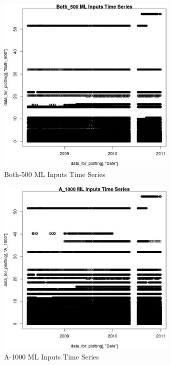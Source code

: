 \begin{figure} 
\centering  
\includegraphics[width=0.77\textwidth]{Code_Outputs/ML_input_report_ML_input_PM25_Step5_part_d_de_duplicated_aves_ML_input_Both_500vDate.jpg} 
\caption{\label{fig:ML_input_report_ML_input_PM25_Step5_part_d_de_duplicated_aves_ML_inputBoth_500vDate}Both-500 ML Inputs Time Series} 
\end{figure} 
 

\begin{figure} 
\centering  
\includegraphics[width=0.77\textwidth]{Code_Outputs/ML_input_report_ML_input_PM25_Step5_part_d_de_duplicated_aves_ML_input_A_1000vDate.jpg} 
\caption{\label{fig:ML_input_report_ML_input_PM25_Step5_part_d_de_duplicated_aves_ML_inputA_1000vDate}A-1000 ML Inputs Time Series} 
\end{figure} 
 

